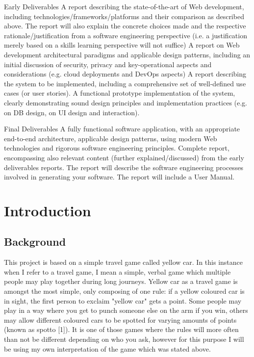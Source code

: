 \documentclass[]{final_report}
\begin{document}
\newpage
Early Deliverables
A report describing the state-of-the-art of Web development, including technologies/frameworks/platforms and their comparison as described above. The report will also explain the concrete choices made and the respective rationale/justification from a software engineering perspective (i.e. a justification merely based on a skills learning perspective will not suffice)
A report on Web development architectural paradigms and applicable design patterns, including an initial discussion of security, privacy and key-operational aspects and considerations (e.g. cloud deployments and DevOps aspects)
A report describing the system to be implemented, including a comprehensive set of well-defined use cases (or user stories).
A functional prototype implementation of the system, clearly demonstrating sound design principles and implementation practices (e.g. on DB design, on UI design and interaction).

Final Deliverables
A fully functional software application, with an appropriate end-to-end architecture, applicable design patterns, using modern Web technologies and rigorous software engineering principles.
Complete report, encompassing also relevant content (further explained/discussed) from the early deliverables reports.
The report will describe the software engineering processes involved in generating your software.
The report will include a User Manual.

\chapter{Introduction}

\section{Background}

This project is based on a simple travel game called yellow car. In this instance when I refer to a travel game, I mean a simple, verbal game which multiple people may play together during long journeys. Yellow car as a travel game is amongst the most simple, only composing of one rule: if a yellow coloured car is in sight, the first person to exclaim "yellow car" gets a point. Some people may play in a way where you get to punch someone else on the arm if you win, others may allow different coloured cars to be spotted for varying amounts of points (known as spotto [1]). It is one of those games where the rules will more often than not be different depending on who you ask, however for this purpose I will be using my own interpretation of the game which was stated above.
\end{document}
